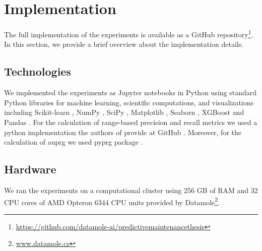 \section{Implementation}
\label{sec:experiments_implementation}

The full implementation of the experiments is available as a GitHub repository\footnote{\url{https://github.com/datamole-ai/predictivemaintenancethesis}}.
In this section, we provide a brief overview about the implementation details.

\subsection{Technologies}

We implemented the experiments as Jupyter notebooks \cite{jupyter} in Python using standard Python libraries for machine learning, scientific computations, and visualizations including Scikit-learn \cite{scikit-learn}, NumPy \cite{numpy}, SciPy \cite{2020SciPy-NMeth}, Matplotlib \cite{matplotlib}, Seaborn \cite{seaborn}, XGBoost \cite{xgboost} and Pandas \cite{pandas}.
For the calculation of range-based precision and recall metrics we used a python implementation the authors of \cite{tatbul2018precision} provide at GitHub \cite{tsmetric}.
Moreover, for the calculation of \acrshort{auprg} we used pyprg package \cite{prg}.

\subsection{Hardware}

We ran the experiments on a computational cluster using 256 GB of RAM and 32 CPU cores of AMD Opteron 6344 CPU units provided by Datamole\footnote{\url{www.datamole.cz}}.




